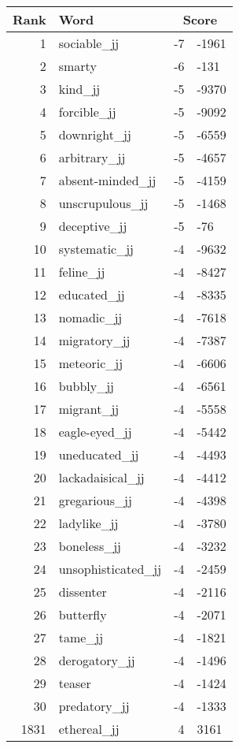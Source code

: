 \begin{longtable}[!htbp]{| rlr@{.}l |}
    \hline
    \textbf{Rank} & \textbf{Word} & \multicolumn{2}{c|}{\textbf{Score}} \\
    \hline
    \endhead
    1 & sociable\_jj & -7 & -1961 \\
    2 & smarty & -6 & -131 \\
    3 & kind\_jj & -5 & -9370 \\
    4 & forcible\_jj & -5 & -9092 \\
    5 & downright\_jj & -5 & -6559 \\
    6 & arbitrary\_jj & -5 & -4657 \\
    7 & absent-minded\_jj & -5 & -4159 \\
    8 & unscrupulous\_jj & -5 & -1468 \\
    9 & deceptive\_jj & -5 & -76 \\
    10 & systematic\_jj & -4 & -9632 \\
    11 & feline\_jj & -4 & -8427 \\
    12 & educated\_jj & -4 & -8335 \\
    13 & nomadic\_jj & -4 & -7618 \\
    14 & migratory\_jj & -4 & -7387 \\
    15 & meteoric\_jj & -4 & -6606 \\
    16 & bubbly\_jj & -4 & -6561 \\
    17 & migrant\_jj & -4 & -5558 \\
    18 & eagle-eyed\_jj & -4 & -5442 \\
    19 & uneducated\_jj & -4 & -4493 \\
    20 & lackadaisical\_jj & -4 & -4412 \\
    21 & gregarious\_jj & -4 & -4398 \\
    22 & ladylike\_jj & -4 & -3780 \\
    23 & boneless\_jj & -4 & -3232 \\
    24 & unsophisticated\_jj & -4 & -2459 \\
    25 & dissenter & -4 & -2116 \\
    26 & butterfly & -4 & -2071 \\
    27 & tame\_jj & -4 & -1821 \\
    28 & derogatory\_jj & -4 & -1496 \\
    29 & teaser & -4 & -1424 \\
    30 & predatory\_jj & -4 & -1333 \\
    1831 & ethereal\_jj & 4 & 3161 \\

\end{longtable}
